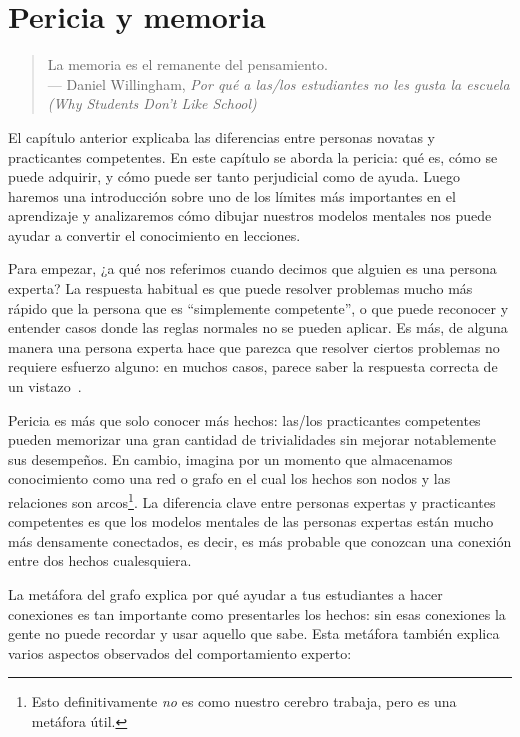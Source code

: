 \chapter{Pericia y memoria}\label{s:memory}

\begin{quote}

  La memoria es el remanente del pensamiento. \\
  --- Daniel Willingham, \emph{Por qué a las/los estudiantes no les gusta la escuela (Why Students Don't Like School)}

\end{quote}

El capítulo anterior explicaba las diferencias entre personas novatas y practicantes competentes.
En este capítulo se aborda la pericia:
qué es,
cómo se puede adquirir,
y cómo puede ser tanto perjudicial como de ayuda.
Luego haremos una introducción sobre uno de los límites más importantes en el aprendizaje
y analizaremos cómo dibujar nuestros modelos mentales nos puede ayudar a convertir el conocimiento en lecciones.

Para empezar,
¿a qué nos referimos cuando decimos que alguien es una persona experta?
La respuesta habitual es que puede resolver problemas mucho más rápido que la persona que es ``simplemente competente'',
o que puede reconocer y entender casos donde las reglas normales no se pueden aplicar.
Es más, de alguna manera una persona experta hace que parezca que resolver ciertos problemas no requiere esfuerzo alguno:
en muchos casos,
parece saber la respuesta correcta de un vistazo~\cite{Parn2017}.

Pericia es más que solo conocer más hechos:
las/los practicantes competentes pueden memorizar una gran cantidad de trivialidades sin  mejorar notablemente sus desempeños.
En cambio,
imagina por un momento que almacenamos conocimiento como una red o grafo en el cual los hechos son nodos
y las relaciones son arcos\footnote{Esto definitivamente \emph{no} es como nuestro cerebro trabaja, pero es una metáfora útil.}.
La diferencia clave entre personas expertas y practicantes competentes es que
los modelos mentales de las personas expertas están mucho más densamente conectados, 
es decir, es más probable que conozcan una conexión entre dos hechos cualesquiera.

La metáfora del grafo explica por qué ayudar a tus estudiantes a hacer conexiones es tan importante como presentarles los hechos:
sin esas conexiones
la gente no puede recordar y usar aquello que sabe.
Esta metáfora también explica varios aspectos observados del comportamiento experto:

